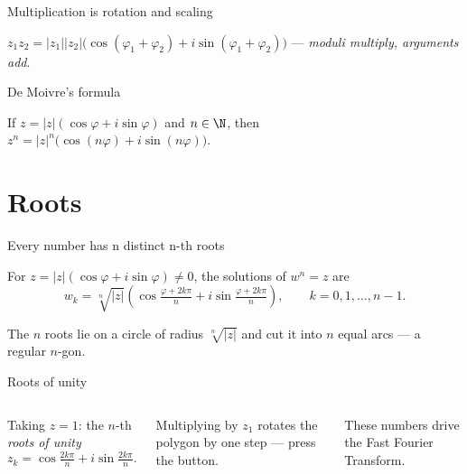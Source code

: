 \begin{frame}{Multiplication is rotation and scaling}
\begin{theorem}
$z_1 z_2 = |z_1||z_2| \big( \cos(\varphi_1 + \varphi_2) + i \sin(\varphi_1 + \varphi_2) \big)$
— \emph{moduli multiply, arguments add}.
\end{theorem}

\end{frame}

\begin{frame}{De Moivre's formula}
\begin{theorem}
If $z = |z|(\cos\varphi + i\sin\varphi)$ and $n \in \N$, then
$z^n = |z|^n \big( \cos(n\varphi) + i \sin(n\varphi) \big)$.
\end{theorem}

\pause

\begin{steps}
\end{steps}
\end{frame}

\section{Roots}

\begin{frame}{Every number has n distinct n-th roots}
\begin{theorem}
For $z = |z|(\cos\varphi + i\sin\varphi) \neq 0$, the solutions of $w^n = z$ are
\[
w_k = \sqrt[n]{|z|} \left( \cos\tfrac{\varphi + 2k\pi}{n} + i \sin\tfrac{\varphi + 2k\pi}{n} \right),
\qquad k = 0, 1, \ldots, n-1.
\]
\end{theorem}

\pause

\begin{fact}
The $n$ roots lie on a circle of radius $\sqrt[n]{|z|}$ and cut it into $n$
equal arcs — a regular $n$-gon.
\end{fact}
\end{frame}

\begin{frame}{Roots of unity}
\begin{columns}
\column
Taking $z = 1$: the $n$-th \emph{roots of unity}
\[
z_k = \cos\tfrac{2k\pi}{n} + i \sin\tfrac{2k\pi}{n}.
\]

Multiplying by $z_1$ rotates the polygon by one step — press the button.

These numbers drive the Fast Fourier Transform.
\column
{}
\end{columns}
\end{frame}

